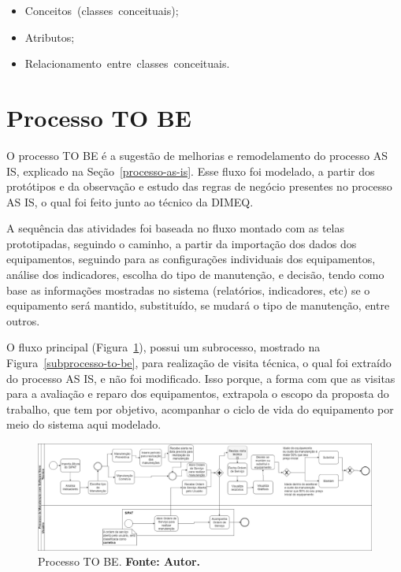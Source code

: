 \begin{itemize}
	\item Conceitos (classes conceituais);
	\item Atributos;
	\item Relacionamento entre classes conceituais.
\end{itemize}



\section{Processo TO BE}
\label{to-be}

O processo TO BE é a sugestão de melhorias e remodelamento do processo AS IS, explicado na Seção~\ref{processo-as-is}. Esse fluxo foi modelado, a partir dos protótipos e da observação e estudo das regras de negócio presentes no processo AS IS, o qual foi feito junto ao técnico da DIMEQ. 

A sequência das atividades foi baseada no fluxo montado com as telas prototipadas, seguindo o caminho, a partir da importação dos dados dos equipamentos, seguindo para as configurações individuais dos equipamentos, análise dos indicadores, escolha do tipo de manutenção, e decisão, tendo como base as informações mostradas no sistema (relatórios, indicadores, etc) se o equipamento será mantido, substituído, se mudará o tipo de manutenção, entre outros.

O fluxo principal (Figura~\ref{processo-to-be}), possui um subrocesso, mostrado na Figura~\ref{subprocesso-to-be}, para realização de visita técnica, o qual foi extraído do processo AS IS, e não foi modificado. Isso porque, a forma com que as visitas para a avaliação e reparo dos equipamentos, extrapola o escopo da proposta do trabalho, que tem por objetivo, acompanhar o ciclo de vida do equipamento por meio do sistema aqui modelado. 


\begin{landscape}
\graphicspath{{figuras/}}
\begin{figure}[H]
\centering
\includegraphics[width=1.5\textwidth]{processo_to_be}
\caption{Processo TO BE. \textbf{Fonte: Autor.}}
\label{processo-to-be}
\end{figure}
\end{landscape} 


